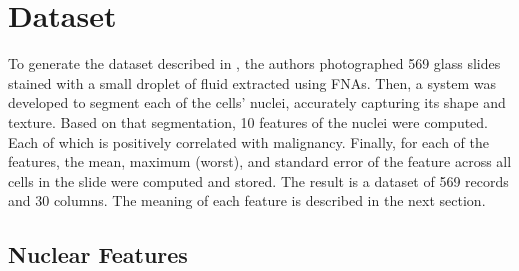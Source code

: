 \documentclass[twocolumn]{article}
\begin{document}
\section{Dataset}
\label{sec:Dataset}

To generate the dataset described in \autocite{Street1993}, the authors
photographed 569 glass slides stained with a small droplet of fluid extracted
using FNAs. Then, a system was developed to segment each of the cells' nuclei,
accurately capturing its shape and texture. Based on that segmentation, 10
features of the nuclei were computed. Each of which is positively correlated
with malignancy. Finally, for each of the features, the mean, maximum (worst),
and standard error of the feature across all cells in the slide were computed
and stored. The result is a dataset of 569 records and 30 columns. The meaning
of each feature is described in the next section.

\subsection{Nuclear Features}
\end{document}
